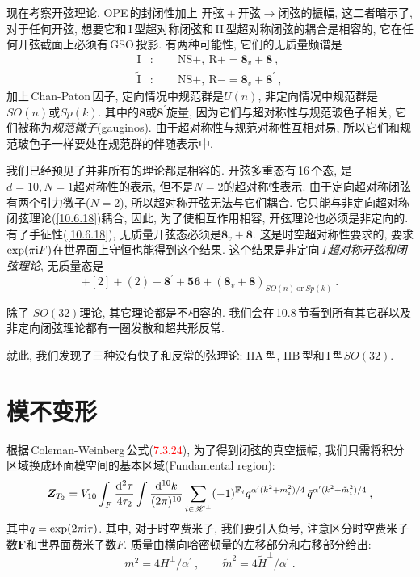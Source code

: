 现在考察开弦理论. OPE\,的封闭性加上 $\text{开弦}+\text{开弦}\to\text{闭弦} $的振幅, 这二者暗示了, 对于任何开弦, 想要它和\,I\,型超对称闭弦和\,II\,型超对称闭弦的耦合是相容的, 它在任何开弦截面上必须有\,GSO\,投影. 有两种可能性, 它们的无质量频谱是
\begin{align*}
    \text{I}&:\qquad \text{NS}+,\:\text{R}+ = \mathbf{8}_{v} +\mathbf{8} \: , \\
    \tilde{\text{I}}&:\qquad \text{NS}+,\:\text{R}- = \mathbf{8}_{v} +\mathbf{8}^{\prime} \: ,
\end{align*}
加上\,Chan-Paton\,因子, 定向情况中规范群是$ U(n)$, 非定向情况中规范群是$ SO(n) $或$ Sp(k)$. 其中的$\mathbf{8} $或$ \mathbf{8}^{\prime} $旋量, 因为它们与超对称性与规范玻色子相关, 它们被称为{\emph{规范微子}}(gauginos). 由于超对称性与规范对称性互相对易, 所以它们和规范玻色子一样要处在规范群的伴随表示中. 

我们已经预见了并非所有的理论都是相容的. 开弦多重态有\,16\,个态, 是$ d=10,N=1 $超对称性的表示, 但不是$ N=2 $的超对称性表示. 由于定向超对称闭弦有两个引力微子($N=2$), 所以超对称开弦无法与它们耦合. 它只能与非定向超对称闭弦理论(\ref{10.6.18})耦合, 因此, 为了使相互作用相容, 开弦理论也必须是非定向的. 有了手征性(\ref{10.6.18}), 无质量开弦态必须是$ \mathbf{8}_{v}+\mathbf{8}$. 这是时空超对称性要求的, 要求$ \exp(\pi\mathrm{i} F) $在世界面上守恒也能得到这个结果. 这个结果是非定向\,\emph{I}\,{\emph{超对称开弦和闭弦理论}}, 无质量态是
\begin{equation}
    [0]+[2]+(2)+\mathbf{8}^{\prime}+\mathbf{56} + (\mathbf{8}_{v}+\mathbf{8})_{SO(n)\:\text{or}\:Sp(k)} \:.\label{10.6.19}
\end{equation}

除了 $SO(32) $理论, 其它理论都是不相容的. 我们会在\,10.8\,节看到所有其它群以及非定向闭弦理论都有一圈发散和超共形反常.

就此, 我们发现了三种没有快子和反常的弦理论: IIA\,型, IIB\,型和\,I\,型$ SO(32)$.

\section{模不变形}


根据\,Coleman-Weinberg\,公式(\textcolor{red}{7.3.24}), 为了得到闭弦的真空振幅, 我们只需将积分区域换成环面模空间的基本区域(Fundamental region):
\begin{equation}
    \bm{Z}_{T_{2}} = V_{10}\int_{F}\frac{\mathrm{d}^{2}\tau}{4\tau_{2}}\int\frac{\mathrm{d}^{10}k}{(2\pi)^{10}}\sum_{i\in\mathscr{H}^{\bot}}(-1)^{\mathbf{F}_{i}}q^{\alpha^{\prime}(k^{2}+m_{i}^{2})/4}\,\bar{q}^{\alpha^{\prime}(k^{2}+\tilde{m}_{i}^{2})/4}\:,\label{10.7.1}
\end{equation}
其中$ q=\exp(2\pi\mathrm{i}\tau)$. 其中, 对于时空费米子, 我们要引入负号, 注意区分时空费米子数$ \mathbf{F} $和世界面费米子数$ F$. 质量由横向哈密顿量的左移部分和右移部分给出:
\begin{equation}
    m^{2} = 4H^{\bot}/\alpha^{\prime}\:,\qquad \tilde{m}^{2}=4\tilde{H}^{\bot}/\alpha^{\prime} \: .\label{10.7.2}
\end{equation}



